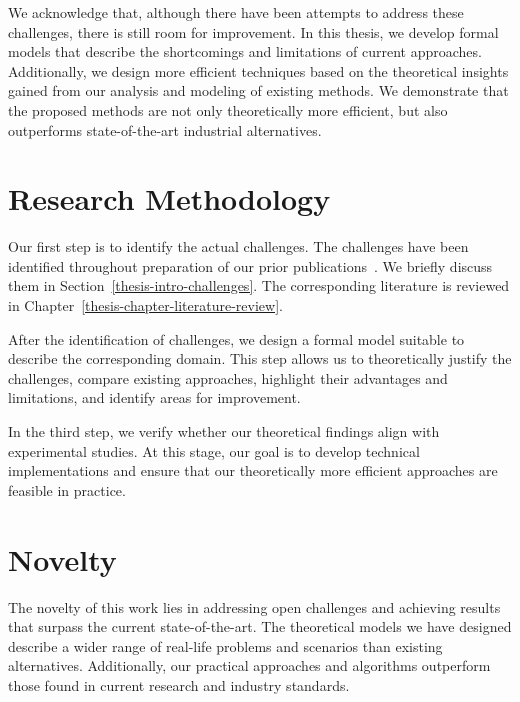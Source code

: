 We acknowledge that, although there have been attempts to address these challenges, there is still room for improvement. In this thesis, we develop formal models that describe the shortcomings and limitations of current approaches. Additionally, we design more efficient techniques based on the theoretical insights gained from our analysis and modeling of existing methods. We demonstrate that the proposed methods are not only theoretically more efficient, but also outperforms state-of-the-art industrial alternatives.

\section{Research Methodology}

Our first step is to identify the actual challenges. The challenges have been identified throughout preparation of our prior publications~\cite{we2018adbis, trofimov2018consistency, we2018seim, we2018beyondmr, we2019debs, webirte, thepaper, 10.1145/3524860.3539809, trofimov2023bounding}. We briefly discuss them in Section~\ref{thesis-intro-challenges}. The corresponding literature is reviewed in Chapter~\ref{thesis-chapter-literature-review}.

After the identification of challenges, we design a formal model suitable to describe the corresponding domain. This step allows us to theoretically justify the challenges, compare existing approaches, highlight their advantages and limitations, and identify areas for improvement.

In the third step, we verify whether our theoretical findings align with experimental studies. At this stage, our goal is to develop technical implementations and ensure that our theoretically more efficient approaches are feasible in practice.

\section{Novelty}

The novelty of this work lies in addressing open challenges and achieving results that surpass the current state-of-the-art. The theoretical models we have designed describe a wider range of real-life problems and scenarios than existing alternatives. Additionally, our practical approaches and algorithms outperform those found in current research and industry standards. 

